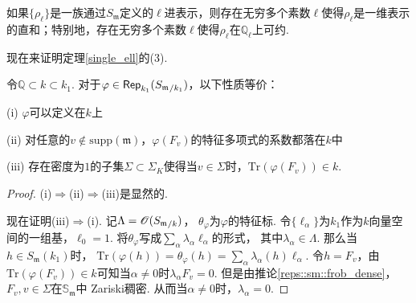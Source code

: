 \begin{ccor}
    如果$\{\rho_{\ell}\}$是一族通过$S_{\mathfrak{m}}$定义的$\ell$进表示，则存在无穷多个素数$\ell$使得$\rho_{\ell}$是一维表示的直和；特别地，存在无穷多个素数$\ell$使得$\rho_{\ell}$在$\mathbb{Q}_{\ell}$上可约.\label{sm_to_reducile}
\end{ccor}

现在来证明定理\ref{single_ell}的(3).

\begin{cprop}
    令$\mathbb{Q}\subset k\subset k_1$. 对于$\varphi\in \mathsf{Rep}_{k_1}({S_{\mathfrak{m}}}_{/k_1})$，以下性质等价：

    (i) $\varphi$可以定义在$k$上

    (ii) 对任意的$v\not\in \mathrm{supp}(\mathfrak{m})$，$\varphi(F_v)$的特征多项式的系数都落在$k$中

    (iii) 存在密度为$1$的子集$\Sigma \subset \Sigma_K$使得当$v\in \Sigma$时，$\mathrm{Tr}(\varphi(F_v))\in k$.
\end{cprop}

\begin{proof}
    (i)$\Rightarrow$(ii)$\Rightarrow$(iii)是显然的.
    
    现在证明(iii)$\Rightarrow$(i). 记$\Lambda = \mathscr{O}({S_{\mathfrak{m}}}_{/k})$，
    $\theta_{\varphi}$为$\varphi$的特征标.
    令$\{\ell_{\alpha}\}$为$k_1$作为$k$向量空间的一组基，$\ell_{0} = 1$.
    将$\theta_{\varphi}$写成$\sum_{\alpha} \lambda_{\alpha} \ell_{\alpha}$的形式，
    其中$\lambda_{\alpha}\in \Lambda$.
    那么当$h\in S_{\mathfrak{m}}(k_1)$时，
    $\mathrm{Tr}(\varphi(h)) = \theta_{\varphi}(h) = \sum_{\alpha} \lambda_{\alpha}(h)\ell_{\alpha}$.
    令$h=F_v$，由$\mathrm{Tr}(\varphi(F_v))\in k$可知当$\alpha\neq 0$时$\lambda_{\alpha}F_v = 0$.
    但是由推论\ref{reps::sm::frob_dense}，$F_v,v\in \Sigma$在$\mathbb{S}_{\mathfrak{m}}$中
    Zariski稠密. 从而当$\alpha\neq 0$时，$\lambda_{\alpha} = 0$.
\end{proof}
